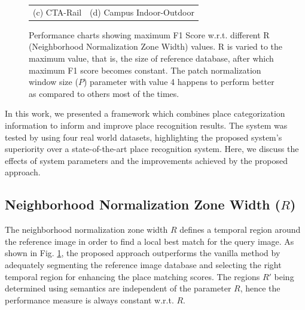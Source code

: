 \documentclass[letterpaper, 10 pt, conference]{ieeeconf}  %
\begin{document}
\begin{figure}
\begin{tabular*}{\textwidth}[t]{cc}
(c) CTA-Rail & (d) Campus Indoor-Outdoor \\
 \end{tabular*}
 \caption{Performance charts showing maximum F1 Score w.r.t. different R (Neighborhood Normalization Zone Width) values. R is varied to the maximum value, that is, the size of reference database, after which maximum F1 score becomes constant. The patch normalization window size ($P$) parameter with value 4 happens to perform better as compared to others most of the times.}
 \label{fig:performanceChart}
\end{figure}


In this work, we presented a framework which combines place categorization information to inform and improve place recognition results. The system was tested by using four real world datasets, highlighting the proposed system's superiority over a state-of-the-art place recognition system. Here, we discuss the effects of system parameters and the improvements achieved by the proposed approach.

\subsection{Neighborhood Normalization Zone Width ($R$)}
The neighborhood normalization zone width $R$ defines a temporal region around the reference image in order to find a local best match for the query image. As shown in Fig. \ref{fig:performanceChart}, the proposed approach outperforms the vanilla method by adequately segmenting the reference image database and selecting the right temporal region for enhancing the place matching scores. The regions $R'$ being determined using semantics are independent of the parameter $R$, hence the performance measure is always constant w.r.t. $R$.
\end{document}
